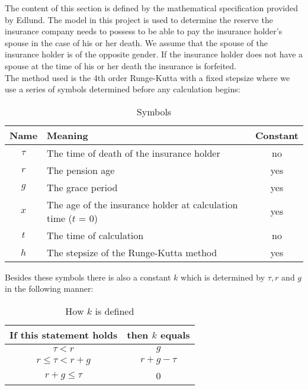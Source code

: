 The content of this section is defined by the mathematical specification\cite{edlu} provided by Edlund. The model in this project is used to determine the reserve the insurance company needs to possess to be able to pay the insurance holder's spouse in the case of his or her death. We assume that the spouse of the insurance holder is of the opposite gender. If the insurance holder does not have a spouse at the time of his or her death the insurance is forfeited. \\

The method used is the 4th order Runge-Kutta with a fixed stepsize \cite{nric} where we use a series of symbols determined before any calculation begins:

\begin{table}
\begin{center}
\begin{tabular}[ht!]{|c|l|c|}
	\hline
\textbf{Name}&\textbf{Meaning}&\textbf{Constant}\\\hline
$\tau$&The time of death of the insurance holder&no\\\hline
$r$&The pension age&yes\\\hline
$g$&The grace period&yes\\\hline
$x$&The age of the insurance holder at calculation time ($t$ = 0)&yes\\\hline
$t$&The time of calculation&no\\\hline
$h$&The stepsize of the Runge-Kutta method&yes\\\hline
\end{tabular}
\end{center}
\caption{Symbols}
\label{table:constants}
\end{table}

Besides these symbols there is also a constant $k$ which is determined by $\tau, r$ and $g$ in the following manner:

\begin{table}
\begin{center}
	\begin{tabular}[ht!]{|c|c|}
		\hline
		\textbf{If this statement holds}&\textbf{then $k$ equals}\\\hline
		$\tau < r$&$g$\\\hline
		$r \leq \tau < r + g$& $r + g - \tau$\\\hline
		$r + g \leq \tau$&0\\\hline
	\end{tabular}
\end{center}
\caption{How $k$ is defined}
\end{table}

